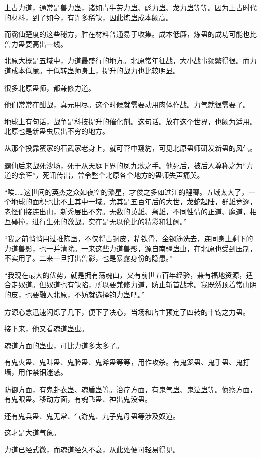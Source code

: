\begin{this_body}
上古力道，通常是兽力蛊，诸如青牛劳力蛊、彪力蛊、龙力蛊等等。因为上古时代的材料，到了如今，有许多稀缺，因此炼蛊成本颇高。

而霸仙楚度的这些秘方，胜在材料普通易于收集。成本低廉，炼蛊的成功可能也比兽力蛊要高出一线。

北原大概是五域中，力道最盛行的地方。北原常年征战，大小战事频繁得很。而力道成本低廉。于低转蛊师身上，提升的战力也比较明显。

很多北原蛊师，都兼修力道。

他们常常在酣战，真元用尽。这个时候就需要动用肉体作战。力气就很需要了。

地球上有句话，战争是科技提升的催化剂。这句话。放在这个世界，也颇为适用。北原也是新蛊虫层出不穷的地方。

从那个投靠蛮家的石武家老身上，就可管中窥豹，可见北原蛊师研发新蛊的风气。

霸仙后来战死沙场，死于从天庭下界的凤九歌之手。他死后，被后人尊称之为“力道的余晖”，死讯传出，曾令整个北原各个地方的蛊师失声痛哭。

“唉……这世间的英杰之众如夜空的繁星，才俊之多如过江的鲤鲫。五域太大了，一个地球的面积也比不上其中一域。尤其是五百年后的大世，龙蛇起陆，群雄竞逐，老怪们接连出山，新秀层出不穷。无数的英雄、枭雄，不同性情的正道、魔道，相互碰撞，进行生死的激战。实在是无以伦比的精彩和壮阔。”

“我之前悄悄用过推陈蛊，不仅将古铜皮，精铁骨，金钢筋洗去，连同身上剩下的力道兽影，也一并清除。一来这些力道兽影，源自南疆蛊虫，在北原也受到压制，不实用了。二来一旦打出兽影，也是暴露身份的隐患。”

“我现在最大的优势，就是拥有荡魂山，又有前世五百年经验，兼有福地资源，适合走奴道。但奴道也有缺陷，所以要兼修力道，防止斩首战术。我既然顶着常山阴的皮，也要融入北原，不妨就选择钧力蛊吧。”

方源心念迅速闪烁了几下，便下了决心，当场和店主预定了四转的十钧之力蛊。

接下来，他又看魂道蛊虫。

魂道方面的蛊虫，可比力道多太多了。

有鬼火蛊、鬼叫蛊、鬼脸蛊、鬼斧蛊等等，用作攻杀。有鬼笼蛊、鬼手蛊、鬼打墙，用作禁锢迷惑。

防御方面，有鬼卦衣蛊、魂盾蛊等。治疗方面，有鬼气蛊、鬼泣蛊等。侦察方面，有鬼眼蛊。移动方面，有魂飞蛊、神出鬼没蛊。

还有鬼兵蛊、鬼无常、气游鬼、九子鬼母蛊等涉及奴道。

这才是大道气象。

力道已经式微，而魂道经久不衰，从此处便可轻易得见。


\end{this_body}
